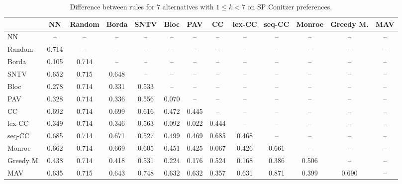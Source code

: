 
\begin{table*}[h!]
\centering
\begin{tabular}{lcccccccccccc}
\toprule
 & NN & Random & Borda & SNTV & Bloc & PAV & CC & lex-CC & seq-CC & Monroe & Greedy M. & MAV \\
\midrule
NN & -- & -- & -- & -- & -- & -- & -- & -- & -- & -- & -- & -- \\
Random & 0.714 & -- & -- & -- & -- & -- & -- & -- & -- & -- & -- & -- \\
Borda & 0.105 & 0.714 & -- & -- & -- & -- & -- & -- & -- & -- & -- & -- \\
SNTV & 0.652 & 0.715 & 0.648 & -- & -- & -- & -- & -- & -- & -- & -- & -- \\
Bloc & 0.278 & 0.714 & 0.331 & 0.533 & -- & -- & -- & -- & -- & -- & -- & -- \\
PAV & 0.328 & 0.714 & 0.336 & 0.556 & 0.070 & -- & -- & -- & -- & -- & -- & -- \\
CC & 0.692 & 0.714 & 0.699 & 0.616 & 0.472 & 0.445 & -- & -- & -- & -- & -- & -- \\
lex-CC & 0.349 & 0.714 & 0.346 & 0.563 & 0.092 & 0.022 & 0.444 & -- & -- & -- & -- & -- \\
seq-CC & 0.685 & 0.714 & 0.671 & 0.527 & 0.499 & 0.469 & 0.685 & 0.468 & -- & -- & -- & -- \\
Monroe & 0.662 & 0.714 & 0.669 & 0.605 & 0.451 & 0.425 & 0.067 & 0.426 & 0.661 & -- & -- & -- \\
Greedy M. & 0.438 & 0.714 & 0.418 & 0.531 & 0.224 & 0.176 & 0.524 & 0.168 & 0.386 & 0.506 & -- & -- \\
MAV & 0.635 & 0.715 & 0.643 & 0.748 & 0.632 & 0.632 & 0.357 & 0.631 & 0.871 & 0.399 & 0.690 & -- \\
\bottomrule
\end{tabular}

\caption{Difference between rules for 7 alternatives with $1 \leq k < 7$ on SP Conitzer preferences.}
\end{table*}
